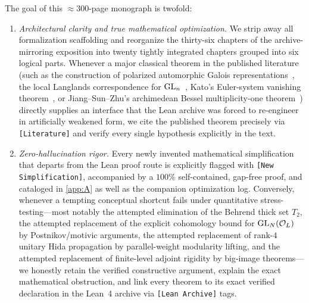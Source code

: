The goal of this $\approx 300$-page monograph is twofold:
\begin{enumerate}[label=(\arabic*)]
\item \emph{Architectural clarity and true mathematical optimization.} We strip away all formalization scaffolding and reorganize the thirty-six chapters of the archive-mirroring exposition into twenty tightly integrated chapters grouped into six logical parts. Whenever a major classical theorem in the published literature (such as the construction of polarized automorphic Galois representations~\cite{BLGGT2014,Shin2011,ChenevierHarris2013,Caraiani2012,Caraiani2014}, the local Langlands correspondence for $\mathrm{GL}_n$~\cite{HarrisTaylor2001,Henniart2000,BushnellHenniart2005,BushnellHenniart2011}, Kato's Euler-system vanishing theorem~\cite{Kato2004}, or Jiang--Sun--Zhu's archimedean Bessel multiplicity-one theorem~\cite{JiangSunZhu2010}) directly supplies an interface that the Lean archive was forced to re-engineer in artificially weakened form, we cite the published theorem precisely via \texttt{[Literature]} and verify every single hypothesis explicitly in the text.

\item \emph{Zero-hallucination rigor.} Every newly invented mathematical simplification that departs from the Lean proof route is explicitly flagged with \texttt{[New Simplification]}, accompanied by a $100\%$ self-contained, gap-free proof, and cataloged in \cref{app:A} as well as the companion optimization log. Conversely, whenever a tempting conceptual shortcut fails under quantitative stress-testing—most notably the attempted elimination of the Behrend thick set $T_2$, the attempted replacement of the explicit cohomology bound for $\mathrm{GL}_N(\mathcal{O}_L)$ by Postnikov/motivic arguments, the attempted replacement of rank-$4$ unitary Hida propagation by parallel-weight modularity lifting, and the attempted replacement of finite-level adjoint rigidity by big-image theorems—we honestly retain the verified constructive argument, explain the exact mathematical obstruction, and link every theorem to its exact verified declaration in the Lean~4 archive via \texttt{[Lean Archive]} tags.
\end{enumerate}

